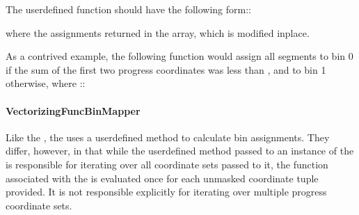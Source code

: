 \documentclass[letterpaper,10pt,english]{sphinxmanual}
\begin{document}
The user\sphinxhyphen{}defined function should have the following form::

\begin{sphinxVerbatim}[commandchars=\\\{\}]
     
\end{sphinxVerbatim}

where the assignments returned in the  array, which is modified
in\sphinxhyphen{}place.

As a contrived example, the following function would assign all segments to bin
0 if the sum of the first two progress coordinates was less than , and
to bin 1 otherwise, where ::

\begin{sphinxVerbatim}[commandchars=\\\{\}]
    
    \PYG{p}{[}\PYG{p}{[}\PYG{p}{]}  \PYG{p}{[}\PYG{p}{]}  \PYG{p}{]}  
    \PYG{p}{[}\PYG{p}{[}\PYG{p}{]}  \PYG{p}{[}\PYG{p}{]}  \PYG{p}{]}  


    
\end{sphinxVerbatim}


\paragraph{VectorizingFuncBinMapper}
\label{\detokenize{users_guide/west/setup:vectorizingfuncbinmapper}}
Like the , the  uses a
user\sphinxhyphen{}defined method to calculate bin assignments. They differ, however, in that
while the user\sphinxhyphen{}defined method passed to an instance of the  is
responsible for iterating over all coordinate sets passed to it, the function
associated with the  is evaluated once for each
unmasked coordinate tuple provided. It is not responsible explicitly for
iterating over multiple progress coordinate sets.
\end{document}
